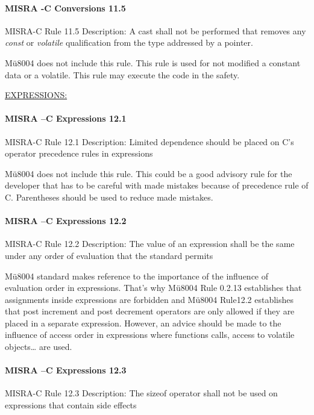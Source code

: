 \paragraph{MISRA -C Conversions 11.5}
MISRA-C Rule 11.5 Description: A cast shall not be performed that removes any {\it const} or {\it volatile} qualification from the type addressed by a pointer.

Mü8004 does not include this rule. This rule is used for not modified a constant data or a volatile. This rule may execute the code in the safety.


\begin{center}
\textsc{\underline{EXPRESSIONS:}}
\end{center}

\paragraph{MISRA –C Expressions 12.1}
MISRA-C Rule 12.1 Description: Limited dependence should be placed on C’s operator precedence rules in expressions

Mü8004 does not include this rule. This could be a good advisory rule for the developer that has to be careful with made mistakes because of precedence rule of C. Parentheses should be used to reduce made mistakes.

\paragraph{MISRA –C Expressions 12.2}
MISRA-C Rule 12.2 Description: The value of an expression shall be the same under any order of evaluation that the standard permits

Mü8004 standard makes reference to the importance of the influence of evaluation order in expressions.  That’s why Mü8004 Rule 0.2.13 establishes that assignments inside expressions are forbidden and Mü8004 Rule12.2 establishes that post increment and post decrement operators are only allowed if they are placed in a separate expression. However, an advice should be made to the influence of access order in expressions where functions calls, access to volatile objects… are used.

\paragraph{MISRA –C Expressions 12.3}
MISRA-C Rule 12.3 Description: The sizeof operator shall not be used on expressions that contain side effects

